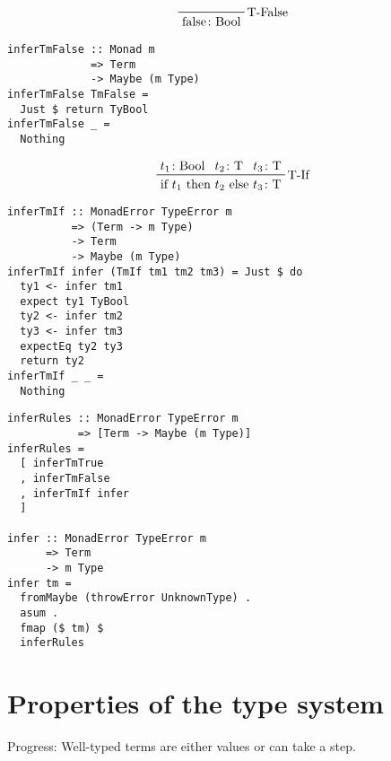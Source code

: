 \documentclass{beamer}
\begin{document}
\begin{frame}[fragile]
  \begin{displaymath}
    \prftree[r]{T-False}
    {\text{false} \colon \text{Bool}}
  \end{displaymath}
  \begin{verbatim}
inferTmFalse :: Monad m 
             => Term 
             -> Maybe (m Type)
inferTmFalse TmFalse =
  Just $ return TyBool
inferTmFalse _ =
  Nothing
  \end{verbatim}
\end{frame}

\begin{frame}[fragile]
  \begin{displaymath}
    \prftree[r]{T-If}
    {t_1 \colon \text{Bool}}
    {t_2 \colon \text{T}}
    {t_3 \colon \text{T}}
    {\text{if $t_1$ then $t_2$ else $t_3$} \colon \text{T}}
  \end{displaymath}
  \begin{verbatim}
inferTmIf :: MonadError TypeError m 
          => (Term -> m Type)
          -> Term 
          -> Maybe (m Type)
inferTmIf infer (TmIf tm1 tm2 tm3) = Just $ do
  ty1 <- infer tm1
  expect ty1 TyBool
  ty2 <- infer tm2
  ty3 <- infer tm3
  expectEq ty2 ty3
  return ty2
inferTmIf _ _ =
  Nothing
  \end{verbatim}
\end{frame}

\begin{frame}[fragile]
  \begin{verbatim}
inferRules :: MonadError TypeError m 
           => [Term -> Maybe (m Type)]
inferRules =
  [ inferTmTrue
  , inferTmFalse
  , inferTmIf infer
  ]

infer :: MonadError TypeError m 
      => Term 
      -> m Type
infer tm =
  fromMaybe (throwError UnknownType) .
  asum .
  fmap ($ tm) $
  inferRules
  \end{verbatim}
\end{frame}

\section{Properties of the type system}

\begin{frame}[c]
  \begin{center}
    Progress: Well-typed terms are either values or can take a step.
  \end{center}
\end{frame}
\end{document}
